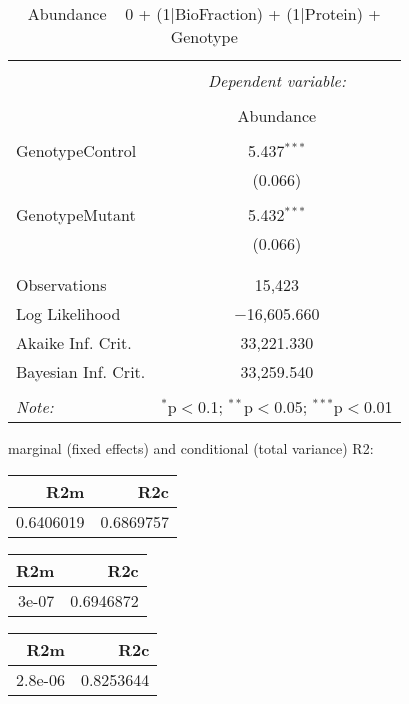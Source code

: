 \documentclass[11pt]{report}
\begin{document}
\begin{table}[!htbp] \centering 
  \caption{Abundance ~ 0 + (1|BioFraction) + (1|Protein) + Genotype} 
  \label{} 
\begin{tabular}{@{\extracolsep{5pt}}lc} 
\\[-1.8ex]\hline 
\hline \\[-1.8ex] 
 & \multicolumn{1}{c}{\textit{Dependent variable:}} \\ 
\cline{2-2} 
\\[-1.8ex] & Abundance \\ 
\hline \\[-1.8ex] 
 GenotypeControl & 5.437$^{***}$ \\ 
  & (0.066) \\ 
  & \\ 
 GenotypeMutant & 5.432$^{***}$ \\ 
  & (0.066) \\ 
  & \\ 
\hline \\[-1.8ex] 
Observations & 15,423 \\ 
Log Likelihood & $-$16,605.660 \\ 
Akaike Inf. Crit. & 33,221.330 \\ 
Bayesian Inf. Crit. & 33,259.540 \\ 
\hline 
\hline \\[-1.8ex] 
\textit{Note:}  & \multicolumn{1}{r}{$^{*}$p$<$0.1; $^{**}$p$<$0.05; $^{***}$p$<$0.01} \\ 
\end{tabular} 
\end{table} 
marginal (fixed effects) and conditional (total variance) R2:

\begin{tabular}{r|r}
\hline
R2m & R2c\\
\hline
0.6406019 & 0.6869757\\
\hline
\end{tabular}

\begin{tabular}{r|r}
\hline
R2m & R2c\\
\hline
3e-07 & 0.6946872\\
\hline
\end{tabular}

\begin{tabular}{r|r}
\hline
R2m & R2c\\
\hline
2.8e-06 & 0.8253644\\
\hline
\end{tabular}
\end{document}
